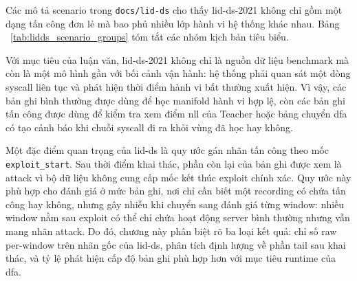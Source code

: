 \documentclass[../main.tex]{subfiles}
\begin{document}
Các mô tả scenario trong \texttt{docs/lid-ds} cho thấy \gls{lid-ds}-2021
không chỉ gồm một
dạng tấn công đơn lẻ mà bao phủ nhiều lớp hành vi hệ thống khác nhau. Bảng
~\ref{tab:lidds_scenario_groups} tóm tắt các nhóm kịch bản tiêu biểu.

\begin{table}[!htbp]
  \caption{Các nhóm kịch bản tiêu biểu trong LID-DS-2021.}
  \label{tab:lidds_scenario_groups}
  \centering
  \renewcommand{\arraystretch}{1.8}
  \renewcommand{\arraystretch}{1}
\end{table}

Với mục tiêu của luận văn, \gls{lid-ds}-2021 không chỉ là nguồn dữ liệu
benchmark mà còn là
một mô hình gần với bối cảnh vận hành: hệ thống phải quan sát một
dòng \gls{syscall} liên tục
và phát hiện thời điểm hành vi bất thường xuất hiện. Vì vậy, các bản
ghi bình thường
được dùng để học manifold hành vi hợp lệ, còn các bản ghi tấn công
được dùng để kiểm
tra xem điểm \gls{nll} của Teacher hoặc bảng chuyển \gls{dfa} có tạo cảnh báo khi
chuỗi \gls{syscall} đi
ra khỏi vùng đã học hay không.

Một đặc điểm quan trọng của \gls{lid-ds} là quy ước gán nhãn tấn công theo mốc
\texttt{exploit\_start}. Sau thời điểm khai thác, phần còn lại của
bản ghi được xem là
attack vì bộ dữ liệu không cung cấp mốc kết thúc exploit chính xác.
Quy ước này phù hợp
cho đánh giá ở mức bản ghi, nơi chỉ cần biết một recording có chứa
tấn công hay không,
nhưng gây nhiễu khi chuyển sang đánh giá từng window: nhiều window
nằm sau exploit có
thể chỉ chứa hoạt động server bình thường nhưng vẫn mang nhãn attack.
Do đó, chương này
phân biệt rõ ba loại kết quả: chỉ số raw per-window trên nhãn gốc của
\gls{lid-ds}, phân tích
định lượng về phần tail sau khai thác, và tỷ lệ phát hiện cấp độ bản
ghi phù hợp hơn với
mục tiêu runtime của \gls{dfa}.
\end{document}
